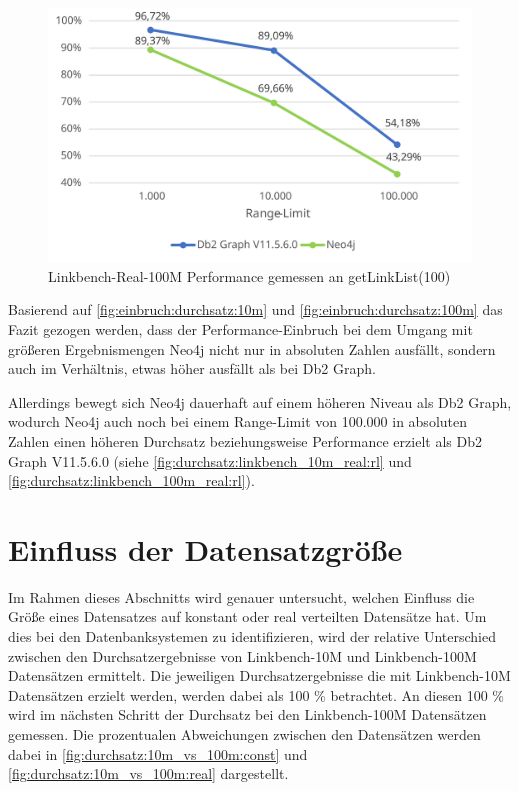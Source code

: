 \begin{figure}[!ht]
    \centering
    \includegraphics[width=\textwidth]{images/diagramme/limit_relative_durchsatz_real_100m.pdf}
    \caption{Linkbench-Real-100M Performance gemessen an getLinkList(100)}
    \label{fig:einbruch:durchsatz:100m}
\end{figure}

Basierend auf \autoref{fig:einbruch:durchsatz:10m} und \autoref{fig:einbruch:durchsatz:100m} das Fazit gezogen werden, dass der Performance-Einbruch bei dem Umgang mit größeren Ergebnismengen Neo4j nicht nur in absoluten Zahlen ausfällt, sondern auch im Verhältnis, etwas höher ausfällt als bei Db2 Graph. 

Allerdings bewegt sich Neo4j dauerhaft auf einem höheren Niveau als Db2 Graph, wodurch Neo4j auch noch bei einem Range-Limit von 100.000 in absoluten Zahlen einen höheren Durchsatz beziehungsweise Performance erzielt als Db2 Graph V11.5.6.0 (siehe \autoref{fig:durchsatz:linkbench_10m_real:rl} und \autoref{fig:durchsatz:linkbench_100m_real:rl}).

\section{Einfluss der Datensatzgröße}
\label{auswertung:groesse}
Im Rahmen dieses Abschnitts wird genauer untersucht, welchen Einfluss die Größe eines Datensatzes auf konstant oder real verteilten Datensätze hat. Um dies bei den Datenbanksystemen zu identifizieren, wird der relative Unterschied zwischen den Durchsatzergebnisse von Linkbench-10M und Linkbench-100M Datensätzen ermittelt. Die jeweiligen Durchsatzergebnisse die mit Linkbench-10M Datensätzen erzielt werden, werden dabei als 100 \% betrachtet. An diesen 100 \% wird im nächsten Schritt der Durchsatz bei den Linkbench-100M Datensätzen gemessen. Die prozentualen Abweichungen zwischen den Datensätzen werden dabei in \autoref{fig:durchsatz:10m_vs_100m:const} und \autoref{fig:durchsatz:10m_vs_100m:real} dargestellt.

